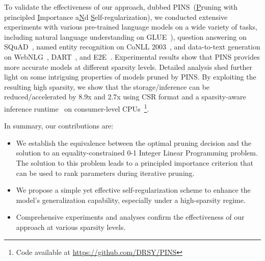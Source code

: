 To validate the effectiveness of our approach, dubbed PINS~(\underline{P}runing with principled \underline{I}mportance a\underline{N}d \underline{S}elf-regularization), we conducted extensive experiments with various pre-trained language models on a wide variety of tasks, including natural language understanding on GLUE~\cite{glue}), question answering on SQuAD~\cite{squad}, named entity recognition on CoNLL 2003~\cite{conll2003}, and data-to-text generation on WebNLG~\cite{webnlg}, DART~\cite{dart}, and E2E~\cite{e2e}. Experimental results show that PINS provides more accurate models at different sparsity levels. Detailed analysis shed further light on some intriguing properties of models pruned by PINS. By exploiting the resulting high sparsity, we show that the storage/inference can be reduced/accelerated by 8.9x and 2.7x using CSR format and a sparsity-aware inference runtime~\cite{deepsparse} on consumer-level CPUs~\footnote{Code available at \url{https://github.com/DRSY/PINS}}.



In summary, our contributions are:

\begin{itemize}
	
	\item We establish the equivalence between the optimal pruning decision and the solution to an equality-constrained 0-1 Integer Linear Programming problem. The solution to this problem leads to a principled importance criterion that can be used to rank parameters during iterative pruning.

\item We propose a simple yet effective self-regularization scheme to enhance the model's generalization capability, especially under a high-sparsity regime.

\item Comprehensive experiments and analyses confirm the effectiveness of our approach at various sparsity levels. 
	
\end{itemize}
